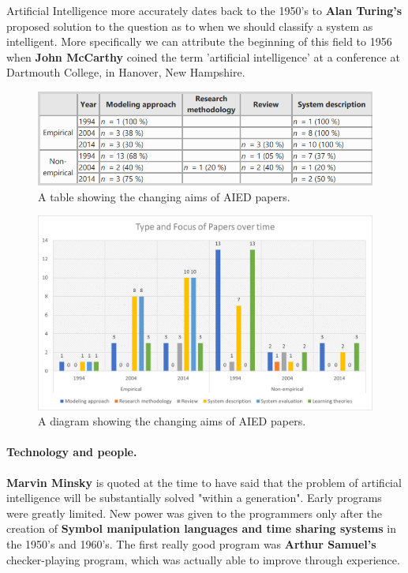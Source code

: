 \documentclass[10pt,a4paper,]{article}
\begin{document}
Artificial Intelligence more accurately dates back to the 1950's to \textbf{Alan Turing's} proposed solution to the question as to when we should classify a system as intelligent. More specifically we can attribute the beginning of this field to 1956 when \textbf{John McCarthy} coined the term 'artificial intelligence' at a conference at Dartmouth College, in Hanover, New Hampshire.\cite{Popenici2017}

\begin{figure}[h]
\includegraphics[width=\textwidth]{Kajan_MIP_tabulka.png}
\caption{A table showing the changing aims of AIED papers. \cite{Roll2016}}
\end{figure}

\begin{figure}[h]
\includegraphics[width=\textwidth]{Kajan_MIP_diagram.png}
\caption{A diagram showing the changing aims of AIED papers. \cite{Roll2016}}
\end{figure}

\paragraph{Technology and people.}

\textbf{Marvin Minsky} is quoted at the time to have said that the problem of artificial intelligence will be substantially solved "within a generation". Early programs were greatly limited. New power was given to the programmers only after the creation of \textbf{Symbol manipulation languages and time sharing systems} in the 1950's and 1960's. The first really good program was \textbf{Arthur Samuel's} checker-playing program, which was actually able to improve through experience.\cite{Buchanan2005}
\end{document}
